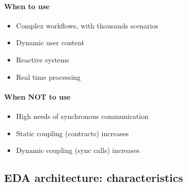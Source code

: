 \begin{flushleft}
  \begin{minipage}[t]{0.45\linewidth}
    \raggedright

    \paragraph{When to use}

    \begin{itemize}
      \item Complex workflows, with thousands scenarios
      \item Dynamic user content
      \item Reactive systems
      \item Real time processing
    \end{itemize}
  \end{minipage}%
  \hfill
  \begin{minipage}[t]{0.45\linewidth}
    \raggedright

    \paragraph{When NOT to use}

    \begin{itemize}
      \item High needs of synchronous communication
      \item Static coupling (contracts) increases
      \item Dynamic coupling (sync calls) increases
    \end{itemize}
  \end{minipage}
\end{flushleft}


\subsection{EDA architecture: characteristics}

